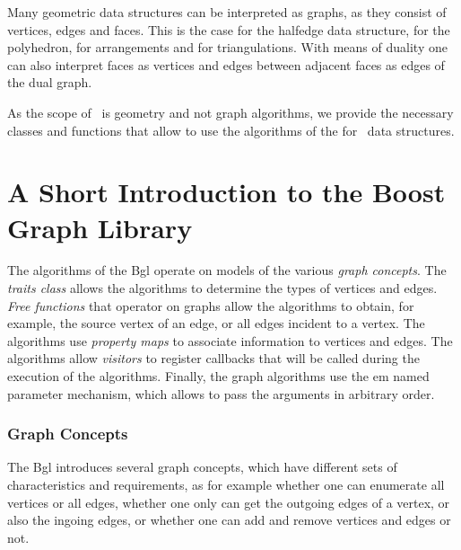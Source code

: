 

Many geometric data structures can be interpreted as graphs, as they consist of
vertices, edges and faces. This is the case for the halfedge data structure,
for the polyhedron, for arrangements and for triangulations. With means of
duality one can also interpret faces as vertices and edges between adjacent
faces as edges of the dual graph. 


As the scope of \cgal\ is geometry and not graph algorithms, we
provide the necessary classes and functions that allow to use the
algorithms of the  for \cgal\ data structures.

\section{A Short Introduction to the Boost Graph Library}

The algorithms of the {\sc Bgl} operate on models of the various {\em graph concepts}. 
The {\em traits class}  allows the algorithms to determine the types of vertices and edges. 
{\em Free functions} that operator on graphs allow the algorithms to obtain,
for example, the source vertex of an edge, or  all edges incident to a vertex. The algorithms 
use {\em property maps} to associate information to vertices and edges. 
The algorithms allow {\em visitors} to register callbacks that will be called
during the execution of the algorithms. Finally, the graph algorithms use
the {em named parameter} mechanism, which allows to pass the  arguments in
arbitrary order.


\subsubsection*{Graph Concepts}

The {\sc Bgl} introduces several graph concepts, which have different sets of characteristics and requirements,
as for example whether one can enumerate all vertices or all edges, whether one only can get the outgoing 
edges of a vertex, or also the ingoing edges, or whether one can add and remove vertices and edges or not. 

